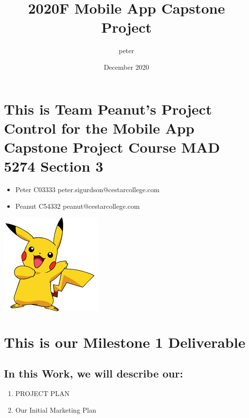 \documentclass{article}
\title{2020F Mobile App Capstone Project}
\author{peter }
\date{December 2020}
\begin{document}
\maketitle

\section{This is Team Peanut's Project Control for the Mobile App Capstone Project Course MAD 5274 Section 3}
\begin{itemize}
    \item Peter C03333 peter.sigurdson@cestarcollege.com
    \item Peanut C54332 peanut@cestarcollege.com
\end{itemize}
\includegraphics{pica_sm.jpg}

\section{This is our Milestone 1 Deliverable}
\subsection{In this Work, we will describe our: }
\begin{enumerate}
    \item PROJECT PLAN
    \item Our Initial Marketing Plan
\end{enumerate}


\end{document}
